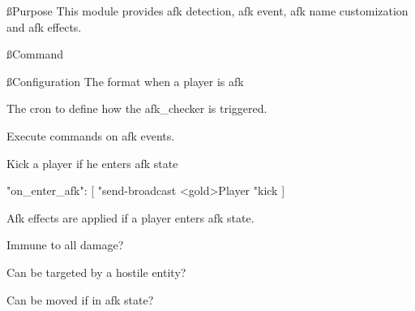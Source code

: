
\ss{Purpose}
This module provides afk detection, afk event, afk name customization and afk effects.

\ss{Command}

\ss{Configuration}
The  format when a player is afk

The cron to define how the afk\_checker is triggered.

Execute commands on afk events.

\begin{example}{Kick a player if he enters afk state}
    \begin{json}
        "on_enter_afk": [
        "send-broadcast <gold>Player %
        "kick %
        ]
    \end{json}
\end{example}

Afk effects are applied if a player enters afk state.

Immune to all damage?

Can be targeted by a hostile entity?

Can be moved if in afk state?












